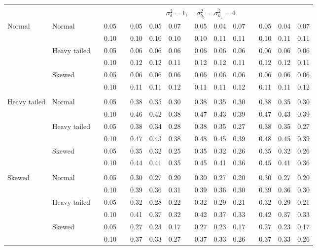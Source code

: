 \documentclass[12pt]{article} %
\begin{document}
\begin{table}[ht]
\begin{scriptsize}
\begin{center}
\begin{tabular}{ll p{.1cm} c p{.1cm} rrr p{.1cm} rrr p{.1cm} rrr}
&&&&&&&&&&&&&&&\\
& && && \multicolumn{9}{c}{$\sigma_{\varepsilon}^2 = 1$, \ \ $\sigma_{b_0}^2 = \sigma_{b_1}^2 = 4$} \\ \cline{6-16}
\rowcolor{gray!20}Normal       & Normal       && 0.05 &&   0.05 & 0.05 & 0.07 && 0.05 & 0.04 & 0.07 && 0.05 & 0.04 & 0.07 \\ 
\rowcolor{gray!20}             &              && 0.10 &&   0.10 & 0.10 & 0.10 && 0.10 & 0.11 & 0.11 && 0.10 & 0.11 & 0.11 \\ 
\rowcolor{gray!20}             & Heavy tailed && 0.05 &&   0.06 & 0.06 & 0.06 && 0.06 & 0.06 & 0.06 && 0.06 & 0.06 & 0.06 \\ 
\rowcolor{gray!20}             &              && 0.10 &&   0.12 & 0.12 & 0.11 && 0.12 & 0.12 & 0.11 && 0.12 & 0.12 & 0.11 \\ 
\rowcolor{gray!20}             & Skewed       && 0.05 &&   0.06 & 0.06 & 0.06 && 0.06 & 0.06 & 0.06 && 0.06 & 0.06 & 0.06 \\ 
\rowcolor{gray!20}             &              && 0.10 &&   0.11 & 0.11 & 0.12 && 0.11 & 0.11 & 0.12 && 0.11 & 0.11 & 0.12 \\ 
             &&&&&&&&&&&&&&&\\
Heavy tailed & Normal       && 0.05 &&   0.38 & 0.35 & 0.30 && 0.38 & 0.35 & 0.30 && 0.38 & 0.35 & 0.30 \\ 
             &              && 0.10 &&   0.46 & 0.42 & 0.38 && 0.47 & 0.43 & 0.39 && 0.47 & 0.43 & 0.39 \\ 
             & Heavy tailed && 0.05 &&   0.38 & 0.34 & 0.28 && 0.38 & 0.35 & 0.27 && 0.38 & 0.35 & 0.27 \\ 
             &              && 0.10 &&   0.47 & 0.43 & 0.38 && 0.48 & 0.45 & 0.39 && 0.48 & 0.45 & 0.39 \\ 
             & Skewed       && 0.05 &&   0.35 & 0.32 & 0.25 && 0.35 & 0.32 & 0.26 && 0.35 & 0.32 & 0.26 \\ 
             &              && 0.10 &&   0.44 & 0.41 & 0.35 && 0.45 & 0.41 & 0.36 && 0.45 & 0.41 & 0.36 \\ 
             &&&&&&&&&&&&&&&\\
Skewed       & Normal       && 0.05 &&   0.30 & 0.27 & 0.20 && 0.30 & 0.27 & 0.20 && 0.30 & 0.27 & 0.20 \\ 
             &              && 0.10 &&   0.39 & 0.36 & 0.31 && 0.39 & 0.36 & 0.30 && 0.39 & 0.36 & 0.30 \\ 
             & Heavy tailed && 0.05 &&   0.32 & 0.28 & 0.22 && 0.32 & 0.29 & 0.21 && 0.32 & 0.29 & 0.21 \\ 
             &              && 0.10 &&   0.41 & 0.37 & 0.32 && 0.42 & 0.37 & 0.33 && 0.42 & 0.37 & 0.33 \\ 
             & Skewed       && 0.05 &&   0.27 & 0.23 & 0.17 && 0.27 & 0.23 & 0.17 && 0.27 & 0.23 & 0.17 \\ 
             &              && 0.10 &&   0.37 & 0.33 & 0.27 && 0.37 & 0.33 & 0.26 && 0.37 & 0.33 & 0.26 \\ 


\end{tabular}
\end{center}
\end{scriptsize}
\end{table}
\end{document}
